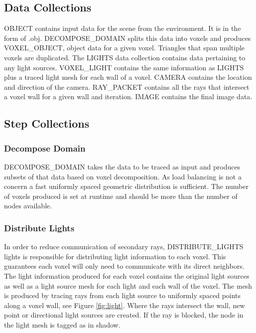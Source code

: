 \subsection{Data Collections}

OBJECT contains input data for the scene from the environment.  It is in the form of .obj.  DECOMPOSE\_DOMAIN splits this data into voxels and produces VOXEL\_OBJECT, object data for a given voxel.  Triangles that span multiple voxels are duplicated.  The LIGHTS data collection contains data pertaining to any light sources.  VOXEL\_LIGHT contains the same information as LIGHTS plus a traced light mesh for each wall of a voxel.  CAMERA contains the location and direction of the camera.  RAY\_PACKET contains all the rays that intersect a voxel wall for a given wall and iteration.  IMAGE contains the final image data.

\subsection{Step Collections}

\subsubsection{Decompose Domain}

DECOMPOSE\_DOMAIN takes the data to be traced as input and produces subsets of that data based on voxel decomposition.  As load balancing is not a concern a fast uniformly spaced geometric distribution is sufficient.  The number of voxels produced is set at runtime and should be more than the number of nodes available.

\subsubsection{Distribute Lights}

In order to reduce communication of secondary rays, DISTRIBUTE\_LIGHTS lights is responsible for distributing light information to each voxel.  This guarantees each voxel will only need to communicate with its direct neighbors.  The light information produced for each voxel contains the original light sources as well as a light source mesh for each light and each wall of the voxel.  The mesh is produced by tracing rays from each light source to uniformly spaced points along a voxel wall, see Figure \ref{fig:light}.  Where the rays intersect the wall, new point or directional light sources are created.  If the ray is blocked, the node in the light mesh is tagged as in shadow.

